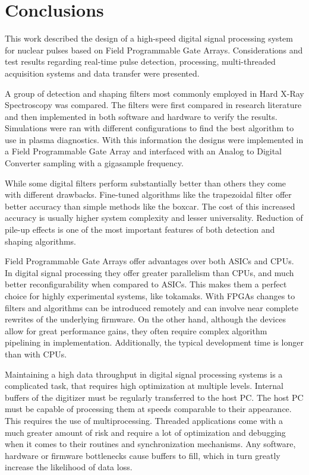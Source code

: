 \section{Conclusions}

This work described the design of 
a high-speed digital signal processing system for nuclear pulses
based on Field Programmable Gate Arrays.
Considerations and test results regarding real-time pulse detection, processing, 
multi-threaded acquisition systems and data transfer were presented.


A group of detection and shaping filters 
most commonly employed in Hard X-Ray Spectroscopy was compared.
The filters were first compared in research literature
and then implemented in both software and hardware to verify the results. 
Simulations were ran with different 
configurations to find the best algorithm to use in plasma diagnostics. With this
information the designs were implemented in a Field Programmable Gate Array
and interfaced with an Analog to Digital Converter sampling with a gigasample frequency.


While some digital filters perform substantially better than others
they come with different drawbacks. Fine-tuned algorithms like the trapezoidal filter
offer better accuracy than simple methods like the boxcar. The cost of this
increased accuracy is usually higher system complexity and lesser universality. 
Reduction of pile-up effects is one of the most important features of 
both detection and shaping algorithms.


Field Programmable Gate Arrays offer advantages over both 
ASICs and CPUs. In digital signal processing they offer greater parallelism
than CPUs, and much better reconfigurability when compared to ASICs. 
This makes them a perfect choice for highly experimental systems, like tokamaks.
With FPGAs changes to filters and algorithms can be introduced remotely and
can involve near complete rewrites of the underlying firmware.
On the other hand, although the devices allow for great performance gains, 
they often require complex algorithm pipelining in implementation. 
Additionally, the typical development time is longer than with CPUs.


Maintaining a high data throughput in digital signal processing systems
is a complicated task, that requires high optimization at multiple levels.
Internal buffers of the digitizer must be regularly transferred to the host PC.
The host PC must be capable of processing them at speeds comparable to their appearance.
This requires the use of multiprocessing.
Threaded applications come with a much greater amount of risk
and require a lot of optimization and debugging
when it comes to their routines and synchronization mechanisms.
Any software, hardware or firmware bottlenecks cause buffers to fill, 
which in turn greatly increase the likelihood of data loss.

